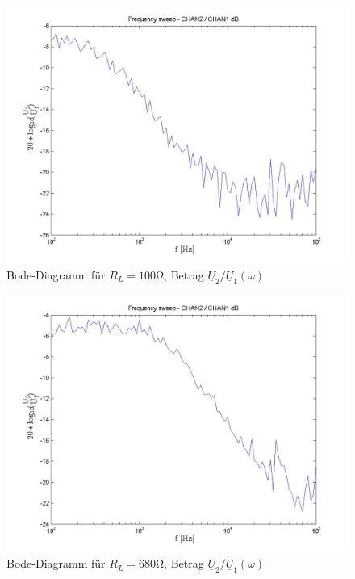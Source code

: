\documentclass[a4paper]{article}
\begin{document}
\begin{figure}[H]
        \centering
        \includegraphics[width=0.8\linewidth]{versuch4/versuch4-100ohm-betrag.jpg}
        \caption{Bode-Diagramm für $R_L=100\si{\ohm}$, Betrag $\underline{U}_2/\underline{U}_1(\omega)$}
        \label{fig:4-100ohm-betrag}
\end{figure}



\begin{figure}[H]
        \centering
        \includegraphics[width=0.8\linewidth]{versuch4/versuch4-680ohm-betrag.jpg}
    \caption{Bode-Diagramm für $R_L=680\si{\ohm}$, Betrag $\underline{U}_2/\underline{U}_1(\omega)$}
    \label{fig:4-680ohm-betrag}
\end{figure}
\end{document}
